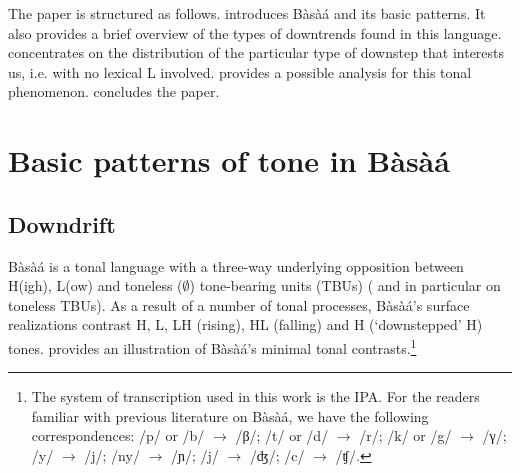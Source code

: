 \documentclass[output=paper,newtxmath,modfonts,nonflat,hidelinks]{langsci/langscibook}
\begin{document}
The paper is structured as follows.  introduces Bàsà{á} and its basic  patterns. It also provides a brief overview of the types of downtrends found in this  language.  concentrates on the distribution of the particular type of downstep that interests us, i.e. with no lexical L  involved.  provides a possible analysis for this tonal phenomenon.  concludes the paper.



\section{Basic patterns of tone in Bàsà{á}}\label{sec:HamlaouiMakasso:2} 
\subsection{Downdrift}
Bàsà{á} is a tonal language with a three-way underlying opposition between H(igh), L(ow) and toneless ($\emptyset$) tone-bearing units (TBUs) (\citealt{Dimmendaal88,Hyman03,Makasso08a} and in particular \citealt{Kody93,HamlaouiEtAl14,MakassoEtAl17} on toneless TBUs). As a result of a number of tonal processes, Bàsà{á}'s surface realizations contrast H, L, LH (rising), HL (falling) and {\↓}H (`downstepped' H) tones.  provides an illustration of Bàsà{á}'s minimal tonal contrasts.\footnote{The system of transcription used in this work is the IPA. For the readers familiar with previous literature on Bàsà{á}, we have the following correspondences: /p/ or /b/ $\to$ {/β/}; /t/ or /d/ $\to$ {/r/}; /k/ or /g/ $\to$ {/γ/}; /y/ $\to$ {/j/}; /ny/ $\to$ {/ɲ/}; /j/ $\to$ {/ʤ/}; /c/ $\to$ {/ʧ/}.} 


%
%
\end{document}
